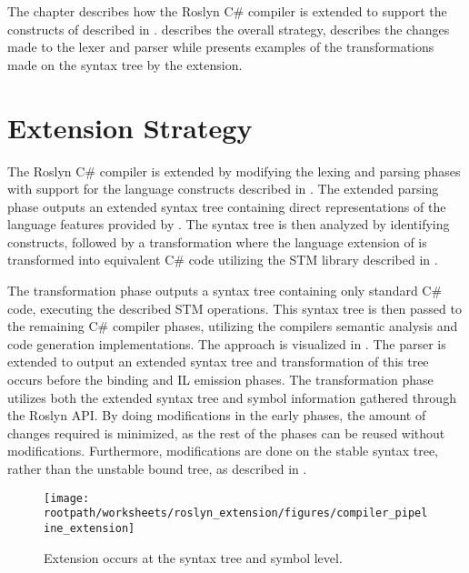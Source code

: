 \makeatletter {}\makeatother
{}
The chapter describes how the Roslyn C\# compiler is extended to support the constructs of \stmnamesp described in .  describes the overall strategy,  describes the changes made to the lexer and parser while  presents examples of the transformations made on the syntax tree by the extension.
\label{chap:roslyn_extension}
\section{Extension Strategy}
\label{sec:roslyn_extension_strategy}
The Roslyn C\# compiler is extended by modifying the lexing and parsing phases with support for the language constructs described in . The extended parsing phase outputs an extended syntax tree containing direct representations of the language features provided by \stmname. The syntax tree is then analyzed by identifying \stmnamesp constructs, followed by a transformation where the language extension of \stmnamesp is transformed into equivalent C\# code utilizing the \ac{STM} library described in . 

The transformation phase outputs a syntax tree containing only standard C\# code, executing the described \ac{STM} operations. This syntax tree is then passed to the remaining C\# compiler phases, utilizing the compilers semantic analysis and code generation implementations. The approach is visualized in . The parser is extended to output an extended syntax tree and transformation of this tree occurs before the binding and IL emission phases. The transformation phase utilizes both the extended syntax tree and symbol information gathered through the Roslyn \ac{API}. By doing modifications in the early phases, the amount of changes required is minimized, as the rest of the phases can be reused without modifications. Furthermore, modifications are done on the stable syntax tree, rather than the unstable bound tree, as described in .
\begin{figure}[htbp]
\centering
 \texttt{[image: \\rootpath/worksheets/roslyn\_extension/figures/compiler\_pipeline\_extension]} 
 \caption{Extension occurs at the syntax tree and symbol level.}
\label{fig:compiler_pipeline_extension}
\end{figure}

